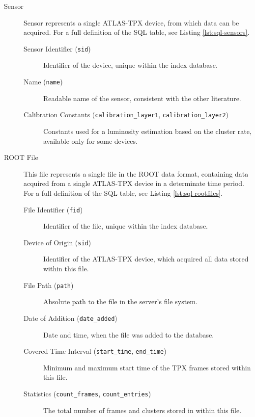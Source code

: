\todo

\label{db:definition}
\begin{description}
	\item[Sensor]
	Sensor represents a single ATLAS-TPX device, from which data can be acquired. For a full definition of the SQL table, see Listing \ref{lst:sql-sensors}.

	\begin{description}
		\item[Sensor Identifier (\texttt{sid})]
		Identifier of the device, unique within the index database.

		\item[Name (\texttt{name})]
		Readable name of the sensor, consistent with the other literature.

		\item[Calibration Constants (\texttt{calibration\_layer1}, \texttt{calibration\_layer2})]
		Constants used for a luminosity estimation based on the cluster rate, available only for some devices.
	\end{description}

	\item[ROOT File]
	This file represents a single file in the ROOT data format, containing data acquired from a single ATLAS-TPX device in a determinate time period. For a full definition of the SQL table, see Listing \ref{lst:sql-rootfiles}.

	\begin{description}
		\item[File Identifier (\texttt{fid})] 
		Identifier of the file, unique within the index database.

		\item[Device of Origin (\texttt{sid})]
		Identifier of the ATLAS-TPX device, which acquired all data stored within this file.

		\item[File Path (\texttt{path})] 
		Absolute path to the file in the server's file system.

		\item[Date of Addition (\texttt{date\_added})]
		Date and time, when the file was added to the database.

		\item[Covered Time Interval (\texttt{start\_time}, \texttt{end\_time})]
		Minimum and maximum start time of the TPX frames stored within this file.

		\item[Statistics (\texttt{count\_frames}, \texttt{count\_entries})]
		The total number of frames and clusters stored in within this file.


\end{description}
\end{description}
